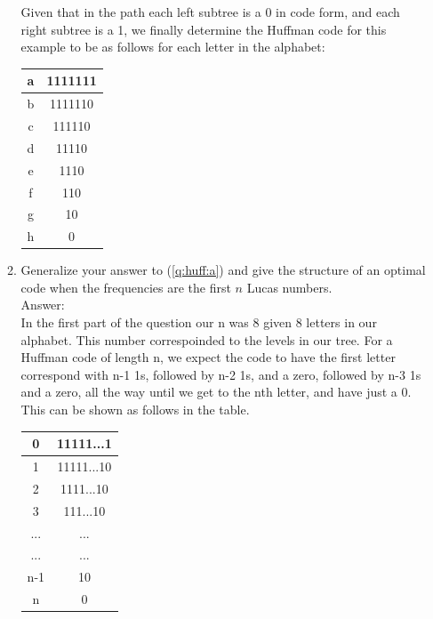 \documentclass[12pt]{article}
\begin{document}
\begin{enumerate}
\begin{enumerate}
        Given that in the path each left subtree is a 0 in code form, and each right subtree is a 1, we finally determine the Huffman code for this example to be as follows for each letter in the alphabet:\\
        
    \begin{center}
    	\begin{tabular}{|c|c|}
    		\hline
    		a & 1111111\\
    		\hline
    		b & 1111110\\
    		\hline
    		c & 111110\\
    		\hline
    		d & 11110\\
    		\hline
    		e & 1110\\
    		\hline
    		f & 110\\
    		\hline
    		g & 10\\
    		\hline
    		h & 0\\
    		\hline
    	\end{tabular}
    \end{center}
        
        \item 
        
        Generalize your answer to (\ref{q:huff:a}) and give the structure of an optimal code when the frequencies are the first $n$ Lucas numbers.\\
        
        Answer:\\
    
        In the first part of the question our n was 8 given 8 letters in our alphabet. This number correspoinded to the levels in our tree. For a Huffman code of length n, we expect the code to have the first letter correspond with n-1 1s, followed by n-2 1s, and a zero, followed by n-3 1s and a zero, all the way until we get to the nth letter, and have just a 0. This can be shown as follows in the table.\\
        
        \begin{center}
    	\begin{tabular}{|c|c|}
    		\hline
    		0 & 11111...1\\
    		\hline
    		1 & 11111...10\\
    		\hline
    		2 & 1111...10\\
    		\hline
    		3 & 111...10\\
    		\hline
    		... & ...\\
    		\hline
    		... & ...\\
    		\hline
    		n-1 & 10\\
    		\hline
    		n & 0\\
    		\hline
    	\end{tabular}
    \end{center}
        

\end{enumerate}
\end{enumerate}
\end{document}
